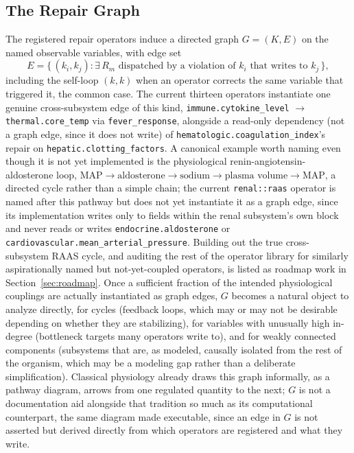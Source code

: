 \documentclass[11pt]{article}
\begin{document}
\subsection{The Repair Graph}

The registered repair operators induce a directed graph $G = (K, E)$ on the named observable variables, with edge set
\[
E = \{\, (k_i, k_j) : \exists\, R_m \text{ dispatched by a violation of } k_i \text{ that writes to } k_j \,\},
\]
including the self-loop $(k, k)$ when an operator corrects the same variable that triggered it, the common case. The current thirteen operators instantiate one genuine cross-subsystem edge of this kind, \texttt{immune.cytokine\_level} $\rightarrow$ \texttt{thermal.core\_temp} via \texttt{fever\_response}, alongside a read-only dependency (not a graph edge, since it does not write) of \texttt{hematologic.coagulation\_index}'s repair on \texttt{hepatic.clotting\_factors}. A canonical example worth naming even though it is not yet implemented is the physiological renin-angiotensin-aldosterone loop, $\text{MAP} \rightarrow \text{aldosterone} \rightarrow \text{sodium} \rightarrow \text{plasma volume} \rightarrow \text{MAP}$, a directed cycle rather than a simple chain; the current \texttt{renal::raas} operator is named after this pathway but does not yet instantiate it as a graph edge, since its implementation writes only to fields within the renal subsystem's own block and never reads or writes \texttt{endocrine.aldosterone} or \texttt{cardiovascular.mean\_arterial\_pressure}. Building out the true cross-subsystem RAAS cycle, and auditing the rest of the operator library for similarly aspirationally named but not-yet-coupled operators, is listed as roadmap work in Section~\ref{sec:roadmap}. Once a sufficient fraction of the intended physiological couplings are actually instantiated as graph edges, $G$ becomes a natural object to analyze directly, for cycles (feedback loops, which may or may not be desirable depending on whether they are stabilizing), for variables with unusually high in-degree (bottleneck targets many operators write to), and for weakly connected components (subsystems that are, as modeled, causally isolated from the rest of the organism, which may be a modeling gap rather than a deliberate simplification). Classical physiology already draws this graph informally, as a pathway diagram, arrows from one regulated quantity to the next; $G$ is not a documentation aid alongside that tradition so much as its computational counterpart, the same diagram made executable, since an edge in $G$ is not asserted but derived directly from which operators are registered and what they write.
\end{document}
